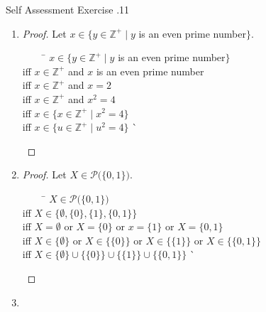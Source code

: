 \documentclass[../notes.tex]{subfiles}
\begin{document}
			\pagebreak
			\begin{exercise}{Self Assessment Exercise \thechapter.11}
				\begin{enumerate}
					\item {}
						\begin{proof}
							Let $x \in \{y \in \mathbb{Z}^{+} \mid y$ is an even prime number$\}$.
							\begin{tabbing}
								$\qquad$ \= $x \in \{y \in \mathbb{Z}^{+} \mid y$ is an even prime number$\}$\\
								iff      \> $x \in \mathbb{Z}^{+}$ and $x$ is an even prime number\\
								iff      \> $x \in \mathbb{Z}^{+}$ and $x = 2$\\
								iff      \> $x \in \mathbb{Z}^{+}$ and $x^{2} = 4$\\
								iff      \> $x \in \{x \in \mathbb{Z}^{+} \mid x^{2} = 4\}$\\
								iff      \> $x \in \{u \in \mathbb{Z}^{+} \mid u^{2} = 4\}$ \` \qedhere
							\end{tabbing}
						\end{proof}
					\item \question{$\mathcal{P}\bigl(\{0, 1\}\bigr) = \{\emptyset\} \cup \bigl\{\{0\}\bigr\} \cup \bigl\{\{1\}\bigr\} \cup \bigl\{\{0, 1\}\bigr\}$}
						\begin{proof}
							Let $X \in \mathcal{P}\bigl(\{0, 1\}\bigr)$.
							\begin{tabbing}
								$\qquad$ \= $X \in \mathcal{P}\bigl(\{0, 1\}\bigr)$\\
								iff \> $X \in \bigl\{\emptyset, \{0\}, \{1\}, \{0, 1\}\bigr\}$\\
								iff \> $X = \emptyset$ or $X = \{0\}$ or $x = \{1\}$ or $X = \{0, 1\}$\\
								iff \> $X \in \{\emptyset\}$ or $X \in \bigl\{\{0\}\bigr\}$ or $X \in \bigl\{\{1\}\bigr\}$ or $X \in \bigl\{\{0, 1\}\bigr\}$\\
								iff \> $X \in \{\emptyset\} \cup \bigl\{\{0\}\bigr\} \cup \bigl\{\{1\}\bigr\} \cup \bigl\{\{0, 1\}\bigr\}$ \` \qedhere
							\end{tabbing}
						\end{proof}
					\item {}

\end{enumerate}
\end{exercise}
\end{document}
